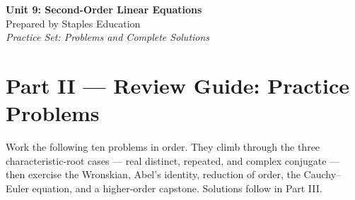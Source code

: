




\begin{center}
    {\LARGE \bfseries Unit 9: Second-Order Linear Equations}\\[6pt]
    {\large Prepared by Staples Education}\\[4pt]
    {\itshape Practice Set: Problems and Complete Solutions}
\end{center}

\vspace{0.4em}

{}
\section*{Part II --- Review Guide: Practice Problems}

Work the following ten problems in order. They climb through the three
characteristic-root cases --- real distinct, repeated, and complex conjugate ---
then exercise the Wronskian, Abel's identity, reduction of order, the
Cauchy--Euler equation, and a higher-order capstone. Solutions follow in
Part III.

